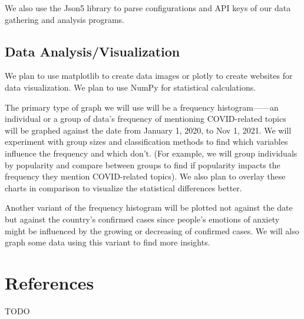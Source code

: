 \documentclass[fontsize=11pt]{article}
\begin{document}
    We also use the Json5 library to parse configurations and API keys of our data gathering and analysis programs.

    \subsection*{Data Analysis/Visualization}

    \indent

    We plan to use matplotlib to create data images or plotly to create websites for data visualization. We plan to use NumPy for statistical calculations.

    The primary type of graph we will use will be a frequency histogram——an individual or a group of data’s frequency of mentioning COVID-related topics will be graphed against the date from January 1, 2020, to Nov 1, 2021. We will experiment with group sizes and classification methods to find which variables influence the frequency and which don’t. (For example, we will group individuals by popularity and compare between groups to find if popularity impacts the frequency they mention COVID-related topics). We also plan to overlay these charts in comparison to visualize the statistical differences better.

    Another variant of the frequency histogram will be plotted not against the date but against the country’s confirmed cases since people’s emotions of anxiety might be influenced by the growing or decreasing of confirmed cases. We will also graph some data using this variant to find more insights.


    \section*{References}

    TODO

\end{document}
